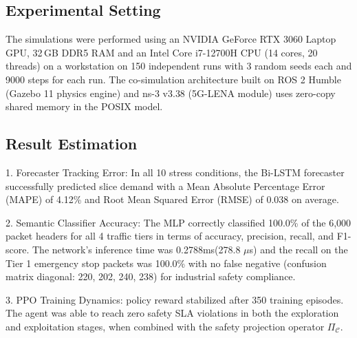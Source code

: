 \documentclass[twocolumn,10pt,twoside]{article}
\begin{document}
\subsection{Experimental Setting}
The simulations were performed using an NVIDIA GeForce RTX 3060 Laptop GPU, 32\,GB DDR5 RAM and an Intel Core i7-12700H CPU (14 cores, 20 threads) on a workstation on 150 independent runs with 3 random seeds each and 9000 steps for each run. The co-simulation architecture built on ROS 2 Humble (Gazebo 11 physics engine) and ns-3 v3.38 (5G-LENA module) uses zero-copy shared memory in the POSIX model.

\clearpage

\subsection{Result Estimation}
1. Forecaster Tracking Error: In all 10 stress conditions, the Bi-LSTM forecaster successfully predicted slice demand with a Mean Absolute Percentage Error (MAPE) of 4.12\% and Root Mean Squared Error (RMSE) of 0.038 on average.

2. Semantic Classifier Accuracy: The MLP correctly classified 100.0\% of the 6,000 packet headers for all 4 traffic tiers in terms of accuracy, precision, recall, and F1-score. The network's inference time was 0.2788ms(278.8 $\mu$s) and the recall on the Tier 1 emergency stop packets was 100.0\% with no false negative (confusion matrix diagonal: 220, 202, 240, 238) for industrial safety compliance.

3. PPO Training Dynamics: policy reward stabilized after 350 training episodes. The agent was able to reach zero safety SLA violations in both the exploration and exploitation stages, when combined with the safety projection operator $\Pi_{\mathcal{C}}$.
\end{document}
